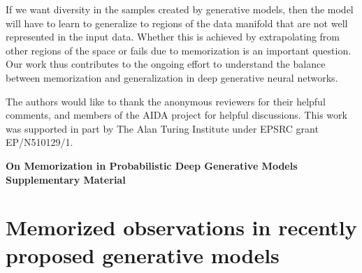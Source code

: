 \documentclass{article}
\begin{document}
If we want diversity in the samples created by generative models, then the 
model will have to learn to generalize to regions of the data manifold that 
are not well represented in the input data. Whether this is achieved by 
extrapolating from other regions of the space or fails due to memorization is 
an important question. Our work thus contributes to the ongoing effort to 
understand the balance between memorization and generalization in deep 
generative neural networks. 

\begin{ack}
	The authors would like to thank the anonymous reviewers for their 
	helpful comments, and members of the AIDA project for helpful 
	discussions. This work was supported in part by The Alan Turing 
	Institute under EPSRC grant EP/N510129/1.
\end{ack}




\clearpage
\appendix

\begin{center}
{\large\bfseries On Memorization in Probabilistic Deep Generative 
	Models\\[.1em]
	Supplementary Material}
\end{center}

\section{Memorized observations in recently proposed generative models}
\label{app:copies}

\end{document}

